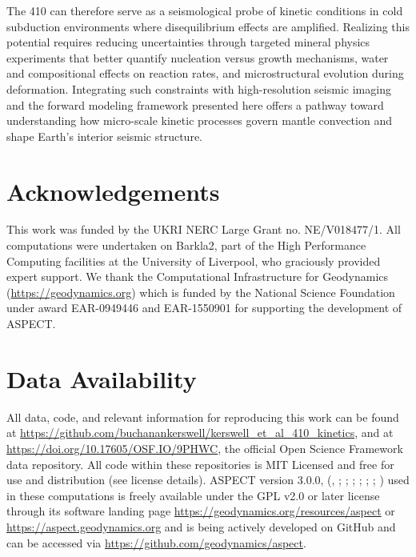 \documentclass[
  paper=a4,
  ,captions=tableheading
]{scrartcl}
\begin{document}
The 410 can therefore serve as a seismological probe of kinetic
conditions in cold subduction environments where disequilibrium effects
are amplified. Realizing this potential requires reducing uncertainties
through targeted mineral physics experiments that better quantify
nucleation versus growth mechanisms, water and compositional effects on
reaction rates, and microstructural evolution during deformation.
Integrating such constraints with high-resolution seismic imaging and
the forward modeling framework presented here offers a pathway toward
understanding how micro-scale kinetic processes govern mantle convection
and shape Earth's interior seismic structure.

\section*{Acknowledgements}\label{acknowledgements}

This work was funded by the UKRI NERC Large Grant no. NE/V018477/1. All
computations were undertaken on Barkla2, part of the High Performance
Computing facilities at the University of Liverpool, who graciously
provided expert support. We thank the Computational Infrastructure for
Geodynamics (\url{https://geodynamics.org}) which is funded by the
National Science Foundation under award EAR-0949446 and EAR-1550901 for
supporting the development of ASPECT.

\section*{Data Availability}\label{sec:data-availability}

All data, code, and relevant information for reproducing this work can
be found at
\url{https://github.com/buchanankerswell/kerswell_et_al_410_kinetics},
and at \url{https://doi.org/10.17605/OSF.IO/9PHWC}, the official Open
Science Framework data repository. All code within these repositories is
MIT Licensed and free for use and distribution (see license details).
ASPECT version 3.0.0, (, ;
;
;
;
;
;
) used in these
computations is freely available under the GPL v2.0 or later license
through its software landing page
\url{https://geodynamics.org/resources/aspect} or
\url{https://aspect.geodynamics.org} and is being actively developed on
GitHub and can be accessed via
\url{https://github.com/geodynamics/aspect}.
\end{document}
